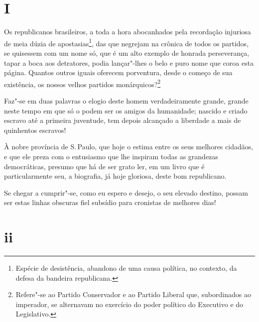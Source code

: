 \section*{I}

\noindent{}Os republicanos brasileiros, a toda a hora abocanhados pela recordação
injuriosa de meia dúzia de apostasias\footnote{Espécie de desistência,
  abandono de uma causa política, no contexto, da defesa da bandeira
  republicana.}, das que negrejam na crônica de todos os partidos, se
quisessem com um nome só, que é um alto exemplo de honrada perseverança,
tapar a boca aos detratores, podia lançar"-lhes o belo e puro nome que
coroa esta página. Quantos outros iguais oferecem porventura, desde o
começo de sua existência, os nossos velhos partidos
monárquicos?\footnote{Refere"-se ao Partido Conservador e ao Partido
  Liberal que, subordinados ao imperador, se alternavam no exercício do
  poder político do Executivo e do Legislativo.}

Faz"-se em duas palavras o elogio deste homem verdadeiramente grande,
grande neste tempo em que só o podem ser os amigos da humanidade;
nascido e criado escravo até a primeira juventude, tem depois alcançado
a liberdade a mais de quinhentos escravos!

À nobre província de S.\,Paulo, que hoje o estima entre os seus melhores
cidadãos, e que ele preza com o entusiasmo que lhe inspiram todas as
grandezas democráticas, presumo que há de ser grato ler, em um livro que
é particularmente seu, a biografia, já hoje gloriosa, deste bom
republicano.

Se chegar a cumprir"-se, como eu espero e desejo, o seu elevado destino,
possam ser estas linhas obscuras fiel subsídio para cronistas de
melhores dias!

\section*{ii}

